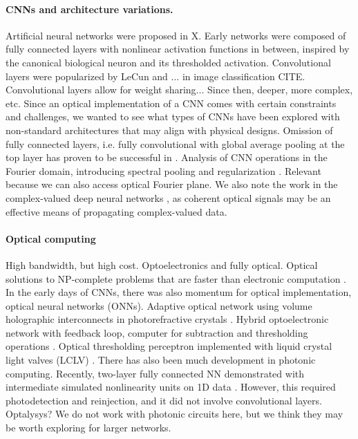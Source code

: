 \paragraph{CNNs and architecture variations.} Artificial neural networks were proposed in X. Early networks were composed of fully connected layers with nonlinear activation functions in between, inspired by the canonical biological neuron and its thresholded activation. Convolutional layers were popularized by LeCun and ... in image classification CITE. Convolutional layers allow for weight sharing... Since then, deeper, more complex, etc. Since an optical implementation of a CNN comes with certain constraints and challenges, we wanted to see what types of CNNs have been explored with non-standard architectures that may align with physical designs. Omission of fully connected layers, i.e. fully convolutional with global average pooling at the top layer has proven to be successful in \cite{lin2013network,iandola2016squeezenet}. Analysis of CNN operations in the Fourier domain, introducing spectral pooling and regularization \cite{rippel2015spectral}. Relevant because we can also access optical Fourier plane. We also note the work in the complex-valued deep neural networks \cite{trabelsi2017deep}, as coherent optical signals may be an effective means of propagating complex-valued data.

\paragraph{Optical computing} High bandwidth, but high cost. Optoelectronics and fully optical. Optical solutions to NP-complete problems that are faster than electronic computation \cite{wu2014optical}.  In the early days of CNNs, there was also momentum for optical implementation, optical neural networks (ONNs). Adaptive optical network using volume holographic interconnects in photorefractive crystals \cite{psaltis1988adaptive}. Hybrid optoelectronic network with feedback loop, computer for subtraction and thresholding operations \cite{lu1989two}. Optical thresholding perceptron implemented with liquid crystal light valves (LCLV) \cite{saxena1995adaptive}. There has also been much development in photonic computing. Recently, two-layer fully connected NN demonstrated with intermediate simulated nonlinearity units on 1D data \cite{shen2017deep}. However, this required photodetection and reinjection, and it did not involve convolutional layers. Optalysys? We do not work with photonic circuits here, but we think they may be worth exploring for larger networks.

